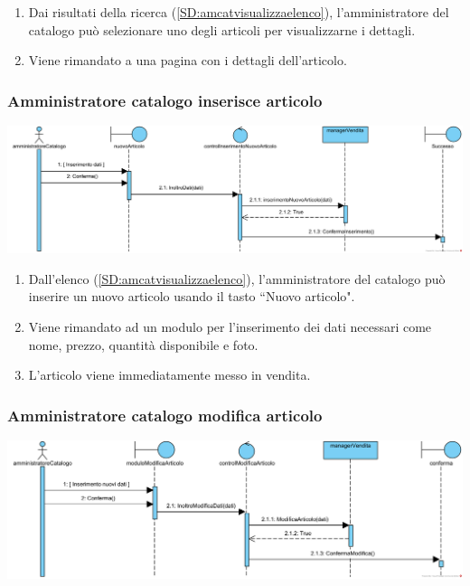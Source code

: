 \documentclass[12pt]{article}
\begin{document}
\begin{enumerate}
\item Dai risultati della ricerca (\ref{SD:amcatvisualizzaelenco}), l'amministratore del catalogo può selezionare uno degli articoli per visualizzarne i dettagli.
\item Viene rimandato a una pagina con i dettagli dell'articolo.
\end{enumerate}

\subsubsection{Amministratore catalogo inserisce articolo}
\label{SD:amcatinseriscearticolo}
\begin{center}
\includegraphics[width=\textwidth]{SequenceDiagram/AmministratoreCatalogoVenditaCrea}
\end{center}

\begin{enumerate}
\item Dall'elenco (\ref{SD:amcatvisualizzaelenco}), l'amministratore del catalogo può inserire un nuovo articolo usando il tasto ``Nuovo articolo".
\item Viene rimandato ad un modulo per l'inserimento dei dati necessari come nome, prezzo, quantità disponibile e foto.
\item L'articolo viene immediatamente messo in vendita.
\end{enumerate}

\subsubsection{Amministratore catalogo modifica articolo}
\label{SD:amcatmodificaarticolo}
\begin{center}
\includegraphics[width=\textwidth]{SequenceDiagram/AmministratoreCatalogoVenditaModifica}
\end{center}
\end{document}
